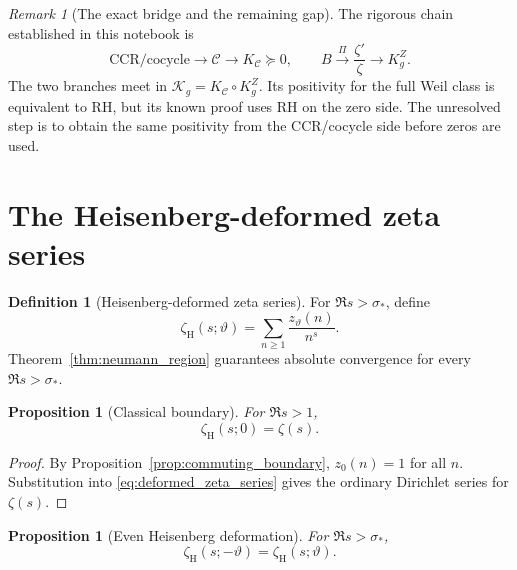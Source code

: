 \documentclass[11pt]{amsart}
\numberwithin{equation}{section}
\theoremstyle{plain}
\newtheorem{proposition}[theorem]{Proposition}
\theoremstyle{definition}
\newtheorem{definition}[theorem]{Definition}
\theoremstyle{remark}
\newtheorem{remark}[theorem]{Remark}
\begin{document}
\begin{remark}[The exact bridge and the remaining gap]
\label{rem:CCR_curvature_Weil_bridge}
The rigorous chain established in this notebook is
\begin{equation}
\boxed{
\text{CCR/cocycle}
\longrightarrow \mathcal C
\longrightarrow K_{\mathcal C}\succeq0,
\qquad
B\xrightarrow{\,\Pi\,}\frac{\zeta'}{\zeta}
\longrightarrow K_g^Z.}
\label{eq:two_branch_bridge}
\end{equation}
The two branches meet in \(\mathscr K_g=K_{\mathcal C}\circ K_g^Z\).
Its positivity for the full Weil class is equivalent to RH, but its known
proof uses RH on the zero side.  The unresolved step is to obtain the same
positivity from the CCR/cocycle side before zeros are used.
\end{remark}

\section{The Heisenberg-deformed zeta series}
\label{sec:deformed_zeta_series}

\begin{definition}[Heisenberg-deformed zeta series]
\label{def:deformed_zeta_series}
For $\Re s>\sigma_*$, define
\begin{equation}
\zeta_{\mathrm H}(s;\vartheta)
=
\sum_{n\ge1}\frac{z_{\vartheta}(n)}{n^s}.
\label{eq:deformed_zeta_series}
\end{equation}
Theorem~\ref{thm:neumann_region} guarantees absolute convergence for every $\Re s>\sigma_*$.
\end{definition}

\begin{proposition}[Classical boundary]
\label{prop:zeta_classical_boundary}
For $\Re s>1$,
\begin{equation}
\zeta_{\mathrm H}(s;0)=\zeta(s).
\label{eq:zeta_classical_boundary}
\end{equation}
\end{proposition}

\begin{proof}
By Proposition~\ref{prop:commuting_boundary}, $z_0(n)=1$ for all $n$.
Substitution into \eqref{eq:deformed_zeta_series} gives the ordinary
Dirichlet series for $\zeta(s)$.
\end{proof}

\begin{proposition}[Even Heisenberg deformation]
\label{prop:zeta_theta_even}
For $\Re s>\sigma_*$,
\begin{equation}
\zeta_{\mathrm H}(s;-\vartheta)
=
\zeta_{\mathrm H}(s;\vartheta).
\label{eq:zeta_theta_even}
\end{equation}
\end{proposition}
\end{document}
